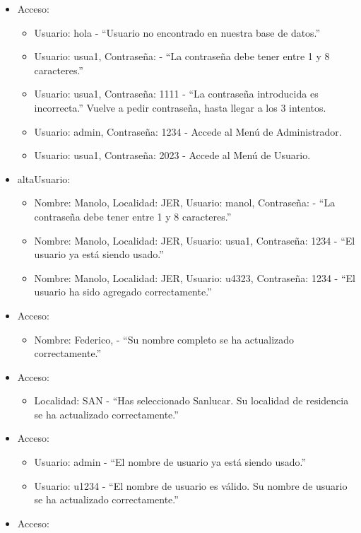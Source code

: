 \begin{itemize}
  \item Acceso:
  \begin{itemize}
    \item Usuario: hola - “Usuario no encontrado en nuestra base de datos.”
    \item Usuario: usua1, Contraseña: - “La contraseña debe tener entre 1 y 8 caracteres.”
    \item Usuario: usua1, Contraseña: 1111 - “La contraseña introducida es incorrecta.” Vuelve a pedir contraseña, hasta llegar a los 3 intentos.
    \item Usuario: admin, Contraseña: 1234 - Accede al Menú de Administrador.
    \item Usuario: usua1, Contraseña: 2023 - Accede al Menú de Usuario.
  \end{itemize}
  \item altaUsuario:
  \begin{itemize}
    \item Nombre: Manolo, Localidad: JER, Usuario: manol, Contraseña: - “La contraseña debe tener entre 1 y 8 caracteres.”
    \item Nombre: Manolo, Localidad: JER, Usuario: usua1, Contraseña: 1234 - “El usuario ya está siendo usado.”
    \item Nombre: Manolo, Localidad: JER, Usuario: u4323, Contraseña: 1234 - “El usuario ha sido agregado correctamente.”
  \end{itemize}
  \item Acceso:
  \begin{itemize}
    \item Nombre: Federico, - “Su nombre completo se ha actualizado correctamente.”
  \end{itemize}
  \item Acceso:
  \begin{itemize}
    \item Localidad: SAN - “Has seleccionado Sanlucar. Su localidad de residencia se ha actualizado correctamente.”
  \end{itemize}
  \item Acceso:
  \begin{itemize}
    \item Usuario: admin - “El nombre de usuario ya está siendo usado.”
    \item Usuario: u1234 - “El nombre de usuario es válido. Su nombre de usuario se ha actualizado correctamente.”
  \end{itemize}
  \item Acceso:

\end{itemize}
